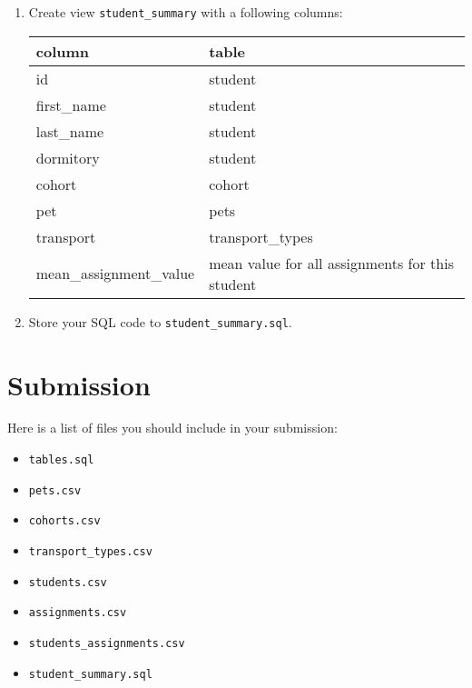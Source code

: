 \documentclass[12pt]{article}
\newcommand{\code}[1]{\texttt{#1}}
\begin{document}
\begin{enumerate}
\item Create view \code{student\_summary} with a following columns:

\begin{tabular}{| l | l | }
  \hline
  \textbf{column} & \textbf{table} \\
  \hline
  id & student \\
  first\_name & student \\
  last\_name & student \\
  dormitory & student \\
  cohort & cohort \\
  pet  & pets \\
  transport & transport\_types \\
  mean\_assignment\_value & mean value for all assignments for this student  \\
  \hline
\end{tabular}

\item Store your SQL code to \code{student\_summary.sql}.

\end{enumerate}

\section*{Submission}

Here is a list of files you should include in your submission:

\begin{itemize}

\item \code{tables.sql}

\item \code{pets.csv}

\item \code{cohorts.csv}

\item \code{transport\_types.csv}

\item \code{students.csv}

\item \code{assignments.csv}

\item \code{students\_assignments.csv}

\item \code{student\_summary.sql}

\end{itemize}
\end{document}
